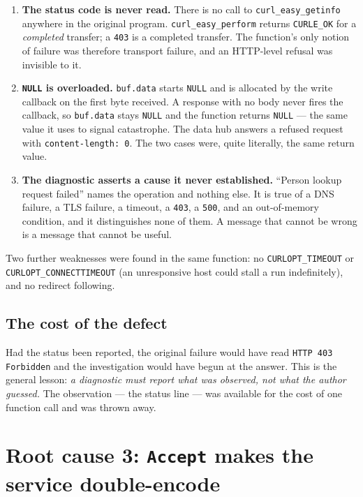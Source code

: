 \documentclass[11pt]{article}
\newcommand{\code}[1]{\texttt{#1}}
\begin{document}
\begin{enumerate}[leftmargin=*]
\item \textbf{The status code is never read.}  There is no call to
      \code{curl\_easy\_getinfo} anywhere in the original program.
      \code{curl\_easy\_perform} returns \code{CURLE\_OK} for a
      \emph{completed} transfer; a \code{403} is a completed transfer.
      The function's only notion of failure was therefore transport
      failure, and an HTTP-level refusal was invisible to it.
\item \textbf{\code{NULL} is overloaded.}  \code{buf.data} starts
      \code{NULL} and is allocated by the write callback on the first
      byte received.  A response with no body never fires the callback,
      so \code{buf.data} stays \code{NULL} and the function returns
      \code{NULL} --- the same value it uses to signal catastrophe.
      The data hub answers a refused request with
      \code{content-length: 0}.  The two cases were, quite literally,
      the same return value.
\item \textbf{The diagnostic asserts a cause it never established.}
      ``Person lookup request failed'' names the operation and nothing
      else.  It is true of a DNS failure, a TLS failure, a timeout, a
      \code{403}, a \code{500}, and an out-of-memory condition, and it
      distinguishes none of them.  A message that cannot be wrong is a
      message that cannot be useful.
\end{enumerate}

\noindent Two further weaknesses were found in the same function: no
\code{CURLOPT\_TIMEOUT} or \code{CURLOPT\_CONNECTTIMEOUT} (an
unresponsive host could stall a run indefinitely), and no redirect
following.

\subsection{The cost of the defect}

Had the status been reported, the original failure would have read
\code{HTTP 403 Forbidden} and the investigation would have begun at
the answer.  This is the general lesson: \emph{a diagnostic must report
what was observed, not what the author guessed.}  The observation ---
the status line --- was available for the cost of one function call and
was thrown away.

\section{Root cause 3: \code{Accept} makes the service double-encode}
\end{document}
